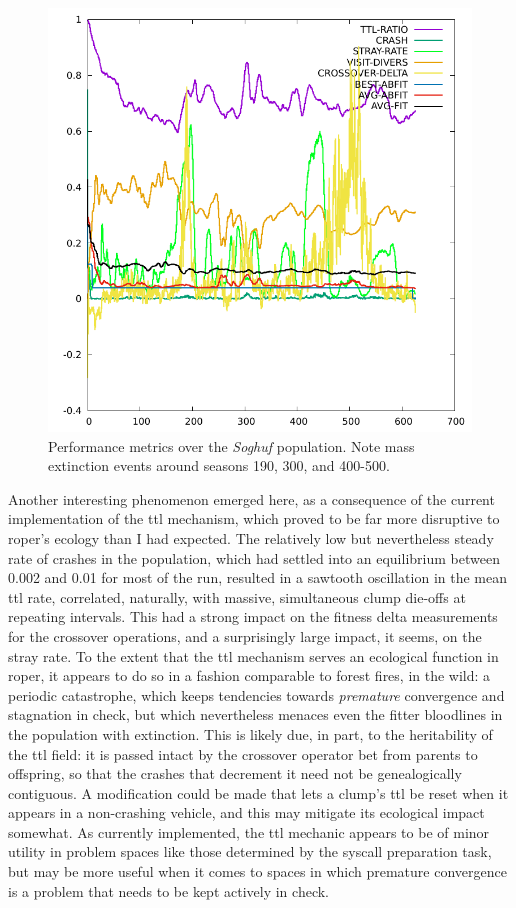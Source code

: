 \documentclass[12pt,glossary]{dalthesis}
\begin{document}
\begin{figure}[htbp]
\centering
\includegraphics[width=.9\linewidth]{../images/plots/soghuf.pdf}
\caption{\label{fig:org279a1cb}
Performance metrics over the \emph{Soghuf} population. Note mass extinction events around seasons 190, 300, and 400-500.}
\end{figure}

Another interesting phenomenon emerged here, as a consequence of the current 
implementation of the \gls{ttl} mechanism, which proved to be far more disruptive
to \gls{roper}'s ecology than I had expected. The relatively low but nevertheless
steady rate of crashes in the population, which had settled into an equilibrium between
0.002 and 0.01 for most of the run, resulted in a sawtooth oscillation in the
mean \gls{ttl} rate, correlated, naturally, with massive, simultaneous clump die-offs at
repeating intervals. This had a strong impact on the fitness delta measurements for
the crossover operations, and a surprisingly large impact, it seems, on the stray
rate. To the extent that the \gls{ttl} mechanism serves an ecological function in
\gls{roper}, it appears to do so in a fashion comparable to forest fires, in the wild:
a periodic catastrophe, which keeps tendencies towards \emph{premature} convergence and
stagnation in check, but which nevertheless menaces even the fitter bloodlines in
the population with extinction. This is likely due, in part, to the heritability
of the \gls{ttl} field: it is passed intact by the crossover operator bet from parents to 
offspring, so that the crashes that decrement it need not be genealogically
contiguous. A modification could be made that lets a clump's \gls{ttl} be reset when
it appears in a non-crashing vehicle, and this may mitigate its ecological
impact somewhat. As currently implemented, the \gls{ttl} mechanic appears to be of
minor utility in problem spaces like those determined by the syscall preparation
task, but may be more useful when it comes to spaces in which premature
convergence is a problem that needs to be kept actively in check.
\end{document}
